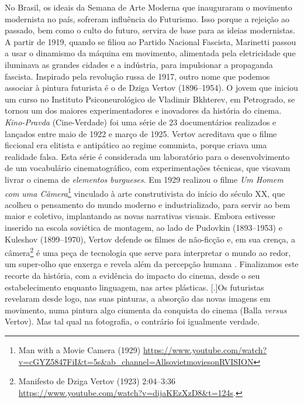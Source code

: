No Brasil, os ideais da Semana de Arte Moderna que inauguraram o
movimento modernista no país, sofreram influência do Futurismo. Isso
porque a rejeição ao passado, bem como o culto do futuro, servira de
base para as ideias modernistas. A partir de 1919, quando se filiou ao
Partido Nacional Fascista, Marinetti passou a usar o dinamismo da
máquina em movimento, alimentada pela eletricidade que iluminava as
grandes cidades e a indústria, para impulsionar a propaganda fascista.
Inspirado pela revolução russa de 1917, outro nome que podemos associar
à pintura futurista é o de Dziga Vertov (1896--1954). O jovem que
iniciou um curso no Instituto Psiconeurológico de Vladimir Bkhterev, em
Petrogrado, se tornou um dos maiores experimentadores e inovadores da
história do cinema. \emph{Kino-Pravda} (Cine-Verdade) foi uma série de
23 documentários realizados e lançados entre maio de 1922 e março de
1925. Vertov acreditava que o filme ficcional era elitista e antipático
ao regime comunista, porque criava uma realidade falsa. Esta série é
considerada um laboratório para o desenvolvimento de um vocabulário
cinematográfico, com experimentações técnicas, que visavam livrar o
cinema de \emph{elementos burgueses}. Em 1929 realizou o filme \emph{Um
	Homem com uma Câmera}\footnote{Man with a Movie Camera (1929)
	\url{https://www.youtube.com/watch?v=cGYZ5847FiI\&t=5s\&ab\_channel=AllsovietmoviesonRVISION}}
vinculado à arte construtivista do início do século XX, que acolheu o
pensamento do mundo moderno e industrializado, para servir ao bem maior
e coletivo, implantando as novas narrativas visuais. Embora estivesse
inserido na escola soviética de montagem, ao lado de Pudovkin
(1893--1953) e Kuleshov (1899--1970), Vertov defende os filmes de
não-ficção e, em sua crença, a câmera\footnote{Manifesto de
	Dziga Vertov (1923) 2:04--3:36
	\url{https://www.youtube.com/watch?v=dijaKEzXzD8&t=124s}.}
é uma peça de tecnologia que serve para interpretar o mundo ao redor,
um super-olho que enxerga e revela além da percepção humana
\parencite{rosebud2020dziga}. Finalizamos este recorte da história, com a
evidência do impacto do cinema, desde o seu estabelecimento enquanto
linguagem, nas artes plásticas.
[.]{Os futuristas revelaram desde
	logo, nas suas pinturas, a absorção das novas imagens em movimento,
	numa pintura algo ciumenta da conquista do cinema (Balla \emph{versus}
	Vertov). Mas tal qual na fotografia, o contrário foi igualmente
	verdade}.

